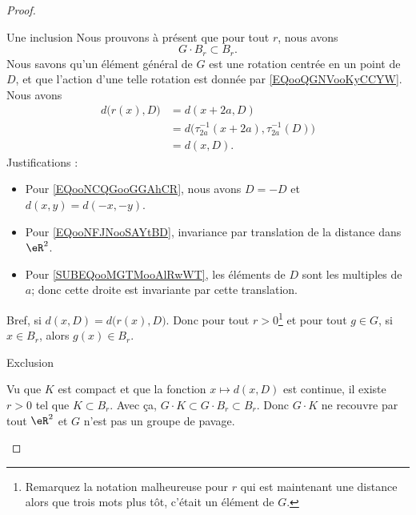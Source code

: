 \begin{proof}
\begin{subproof}
\begin{subproof}
                \item[Une inclusion]
                    Nous prouvons à présent que pour tout \( r\), nous avons
                    \begin{equation}
                        G\cdot B_r \subset B_r.
                    \end{equation}
                    Nous savons qu'un élément général de \( G\) est une rotation centrée en un point de \( D\), et que l'action d'une telle rotation est donnée par \eqref{EQooQGNVooKyCCYW}. Nous avons
                    \begin{subequations}
                        \begin{align}
                            d\big( r(x),D \big)&=d(x+2a,D)      \label{EQooNCQGooGGAhCR}\\
                            &=d\big( \tau_{2a}^{-1}(x+2a),\tau_{2a}^{-1}(D) \big)   \label{EQooNFJNooSAYtBD}\\
                            &=d(x,D)        \label{SUBEQooMGTMooAlRwWT}.
                        \end{align}
                    \end{subequations}
                    Justifications :
                    \begin{itemize}
                        \item Pour \eqref{EQooNCQGooGGAhCR}, nous avons \( D=-D\) et \(d(x,y)=d(-x,-y) \).
                        \item Pour \eqref{EQooNFJNooSAYtBD}, invariance par translation de la distance dans \( \eR^2\).
                        \item Pour \eqref{SUBEQooMGTMooAlRwWT}, les éléments de \( D\) sont les multiples de \( a\); donc cette droite est invariante par cette translation.
                    \end{itemize}
                    Bref, si \(  d(x,D)=d\big( r(x),D \big)   \). Donc pour tout \( r>0\)\footnote{Remarquez la notation malheureuse pour \( r\) qui est maintenant une distance alors que trois mots plus tôt, c'était un élément de \( G\).} et pour tout \( g\in G\), si \( x\in B_r\), alors \( g(x)\in B_r\).

                \item[Exclusion]

                    Vu que \( K\) est compact et que la fonction \( x\mapsto d(x,D)\) est continue, il existe \( r>0\) tel que \( K\subset B_r\). Avec ça, \( G\cdot K\subset G\cdot B_r\subset B_r\). Donc \( G\cdot K\) ne recouvre par tout \( \eR^2\) et \( G\) n'est pas un groupe de pavage.


\end{subproof}
\end{subproof}
\end{proof}
